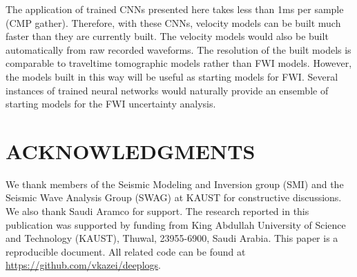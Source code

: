 \documentclass[manuscript]{geophysics}
\begin{document}
The application of trained CNNs presented here takes less than 1ms per sample (CMP gather). Therefore, with these CNNs, velocity models can be built much faster than they are currently built. The velocity models would also be built automatically from raw recorded waveforms. The resolution of the built models is comparable to traveltime tomographic models rather than FWI models. However, the models built in this way will be useful as starting models for FWI. Several instances of trained neural networks would naturally provide an ensemble of starting models for the FWI uncertainty analysis. 

\section{ACKNOWLEDGMENTS}

We thank members of the Seismic Modeling and Inversion group (SMI) and the Seismic Wave Analysis Group (SWAG) at KAUST for constructive discussions. We also thank Saudi Aramco for support.
The research reported in this publication was supported by funding from King Abdullah University of Science and Technology (KAUST), Thuwal, 23955-6900, Saudi Arabia.
%
This paper is a reproducible document. All related code can be found at \href{https://github.com/vkazei/deeplogs}{https://github.com/vkazei/deeplogs}.





\newpage


\end{document}
